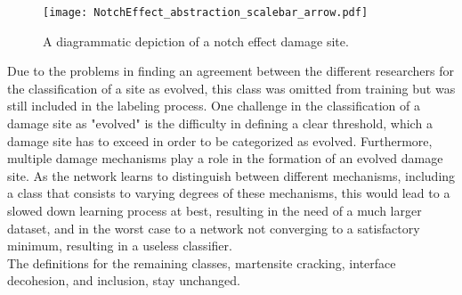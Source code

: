 \begin{figure}[H]
\centering
\texttt{[image: NotchEffect\_abstraction\_scalebar\_arrow.pdf]}
\caption{A diagrammatic depiction of a notch effect damage site.}
\label{fig:Notch_scalebar}
\end{figure}

Due to the problems in finding an agreement between the different researchers for the classification of a site as evolved, this class was omitted from training but was still included in the labeling process. One challenge in the classification of a damage site as "evolved" is the difficulty in defining a clear threshold, which a damage site has to exceed in order to be categorized as evolved. Furthermore, multiple damage mechanisms play a role in the formation of an evolved damage site. As the network learns to distinguish between different mechanisms, including a class that consists to varying degrees of these mechanisms, this would lead to a slowed down learning process at best, resulting in the need of a much larger dataset, and in the worst case to a network not converging to a satisfactory minimum, resulting in a useless classifier.\\ 


The definitions for the remaining classes, martensite cracking, interface decohesion, and inclusion, stay unchanged. 


